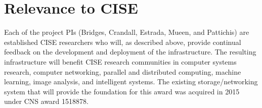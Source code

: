 \documentclass[11pt]{article}
\begin{document}
\section{Relevance to CISE}

Each of the project PIs (Bridges, Crandall, Estrada, Mueen, and Pattichis) are established
CISE researchers who will, as described above, provide continual feedback on the development
and deployment of the infrastructure. The resulting infrastructure will benefit CISE research
communities in computer systems research, computer networking, parallel and distributed computing, 
machine learning, image analysis, and intelligent systems. The existing storage/networking system that 
will provide the foundation for this award was acquired in 2015 under CNS award 1518878.
 
%
%
\end{document}
